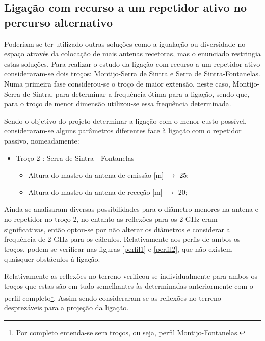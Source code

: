 \subsection{Ligação com recurso a um repetidor ativo no percurso alternativo}

Poderiam-se ter utilizado outras soluções como a igualação ou diversidade no espaço através da colocação de mais antenas recetoras, mas o enunciado restringia estas soluções. Para realizar o estudo da ligação com recurso a um repetidor ativo consideraram-se dois troços: Montijo-Serra de Sintra e Serra de Sintra-Fontanelas. Numa primeira fase considerou-se o troço de maior extensão, neste caso, Montijo-Serra de Sintra, para determinar a frequência ótima para a ligação, sendo que, para o troço de menor dimensão utilizou-se essa frequência determinada.

Sendo o objetivo do projeto determinar a ligação com o menor custo possível, consideraram-se alguns parâmetros diferentes face à ligação com o repetidor passivo, nomeadamente:
\begin{itemize}
\item Troço 2 : Serra de Sintra - Fontanelas
\begin{itemize}
\item Altura do mastro da antena de emissão [m] $\rightarrow$ 25;
\item Altura do mastro da antena de receção [m] $\rightarrow$ 20;
\end{itemize}
\end{itemize}
Ainda se analisaram diversas possibilidades para o diâmetro menores na antena e no repetidor no troço 2, no entanto as reflexões para os 2 GHz eram significativas, então optou-se por não alterar os diâmetros e considerar a frequência de 2 GHz para os cálculos.
Relativamente aos perfis de ambos os troços, podem-se verificar nas figuras \ref{perfil1} e \ref{perfil2}, que não existem quaisquer obstáculos à ligação.

Relativamente as reflexões no terreno verificou-se individualmente para ambos os troços que estas são em tudo semelhantes às determinadas anteriormente com o perfil completo\footnote{Por completo entenda-se sem troços, ou seja, perfil Montijo-Fontanelas.}. Assim sendo consideraram-se as reflexões no terreno desprezáveis para a projeção da ligação.

